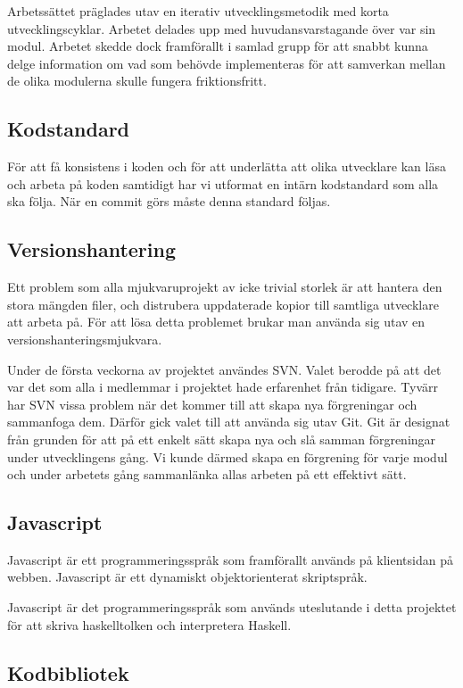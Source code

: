 Arbetssättet präglades utav en iterativ utvecklingsmetodik med korta utvecklingscyklar. Arbetet delades upp med huvudansvarstagande över var sin modul. Arbetet skedde dock framförallt i samlad grupp för att snabbt kunna delge information om vad som behövde implementeras för att samverkan mellan de olika modulerna skulle fungera friktionsfritt.

\subsection{Kodstandard} 
För att få konsistens i koden och för att underlätta att olika utvecklare kan läsa och arbeta på koden samtidigt har vi utformat en intärn kodstandard som alla ska följa.
När en commit görs måste denna standard följas.

\subsection{Versionshantering} 
Ett problem som alla mjukvaruprojekt av icke trivial storlek är att hantera den stora mängden filer, och distrubera uppdaterade kopior till samtliga utvecklare att arbeta på.
För att lösa detta problemet brukar man använda sig utav en versionshanteringsmjukvara. 

Under de första veckorna av projektet användes SVN. Valet berodde på att det var det som alla i medlemmar i projektet hade erfarenhet från tidigare. Tyvärr har SVN vissa problem när det kommer till att skapa nya förgreningar och sammanfoga dem. Därför gick valet till att använda sig utav Git. Git är designat från grunden för att på ett enkelt sätt skapa nya och slå samman förgreningar under utvecklingens gång. Vi kunde därmed skapa en förgrening för varje modul och under arbetets gång sammanlänka allas arbeten på ett effektivt sätt. 

\subsection{Javascript} 
Javascript \citep{javascript} är ett programmeringsspråk som framförallt används på klientsidan på webben. Javascript är ett dynamiskt objektorienterat skriptspråk.

Javascript är det programmeringsspråk som används uteslutande i detta projektet för att skriva haskelltolken och interpretera Haskell.

\subsection{Kodbibliotek}

